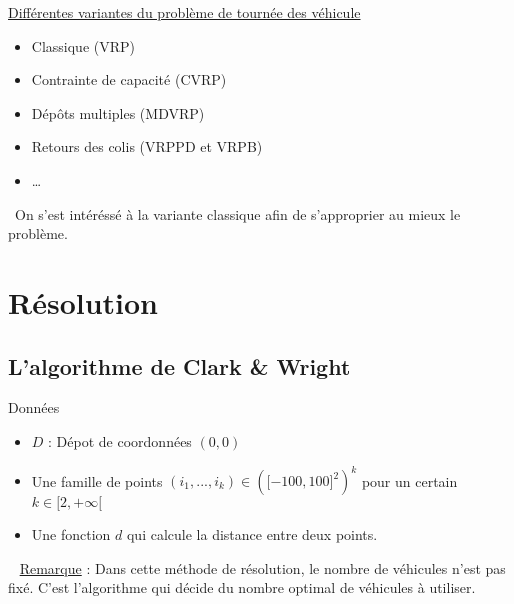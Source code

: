 \documentclass[10pt]{beamer}
\begin{document}
	\begin{frame}
		\underline{Différentes variantes du problème de tournée des véhicule}
		\begin{itemize}[label=—]
			\item Classique (VRP) \pause
			\item Contrainte de capacité (CVRP) \pause
			\item Dépôts multiples (MDVRP) \pause
			\item Retours des colis (VRPPD et VRPB) \pause
			\item \dots \pause
		\end{itemize}
		\ \newline On s'est intéréssé à la variante classique afin de s'approprier au mieux le problème.
	\end{frame}
	
	\section{Résolution}

	\subsection{L'algorithme de Clark \& Wright}

	\begin{frame}
		\begin{beamerboxesrounded}[upper=data_up,lower=data_low,shadow=true]{Données} \pause
			\begin{itemize}[label=-]
				\item $D$ : Dépot de coordonnées $(0,0)$\pause
				\item Une famille de points \((i_1,...,i_k) \in {(\lbrack-100,100\rbrack^2)}^k\) pour un certain $k \in \lbrack2,+\infty\lbrack$\pause
				\item Une fonction $d$ qui calcule la distance entre deux points. \pause
			\end{itemize}
		\end{beamerboxesrounded}\ \newline
		\underline{Remarque} : Dans cette méthode de résolution, le nombre de véhicules n'est pas fixé. C'est l'algorithme qui décide du nombre optimal de véhicules à utiliser. 
	\end{frame}
	 
\end{document}
